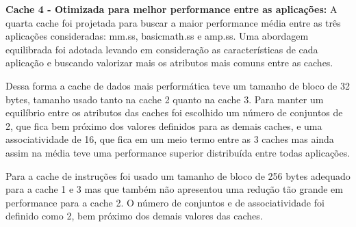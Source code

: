 \documentclass[12pt]{article}
\begin{document}
\textbf{Cache 4 - Otimizada para melhor performance entre as aplicações:}
A quarta cache foi projetada para buscar a maior performance média entre as três aplicações consideradas: mm.ss, basicmath.ss e amp.ss. Uma abordagem equilibrada foi adotada levando em consideração as características de cada aplicação e buscando valorizar mais os atributos mais comuns entre as caches.

Dessa forma a cache de dados mais performática teve um tamanho de bloco de 32 bytes, tamanho usado tanto na cache 2 quanto na cache 3. Para manter um equilíbrio entre os atributos das caches foi escolhido um número de conjuntos de 2, que fica bem próximo dos valores definidos para as demais caches, e uma associatividade de 16, que fica em um meio termo entre as 3 caches mas ainda assim na média teve uma performance superior distribuída entre todas aplicações. 

Para a cache de instruções foi usado um tamanho de bloco de 256 bytes adequado para a cache 1 e 3 mas que também não apresentou uma redução tão grande em performance para a cache 2. O número de conjuntos e de associatividade foi definido como 2, bem próximo dos demais valores das caches.
\end{document}
